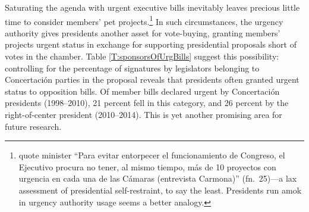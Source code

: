 \documentclass[letter,12pt]{article}
\begin{document}
Saturating the agenda with urgent executive bills inevitably leaves precious little time to consider members' pet projects.\footnote{\citet{berrios.gamboa.fiscChile.2006} quote minister ``Para evitar entorpecer el funcionamiento de Congreso, el Ejecutivo procura no tener, al mismo tiempo, más de 10 proyectos con urgencia en cada una de las Cámaras (entrevista Carmona)'' (fn.~25)---a lax assessment of presidential self-restraint, to say the least. Presidents run amok in urgency authority usage seems a better analogy.} In such circumstances, the urgency authority gives presidents another asset for vote-buying, granting members' projects urgent status in exchange for supporting presidential proposals short of votes in the chamber. Table \ref{T:sponsorsOfUrgBills} suggest this possibility: controlling for the percentage of signatures by legislators belonging to Concertaci\'on parties in the proposal reveals that presidents often granted urgent status to opposition bills. Of member bills declared urgent by Concertaci\'on presidents (1998--2010), 21 percent fell in this category, and 26 percent by the right-of-center president (2010--2014). This is yet another promising area for future research.
\end{document}
